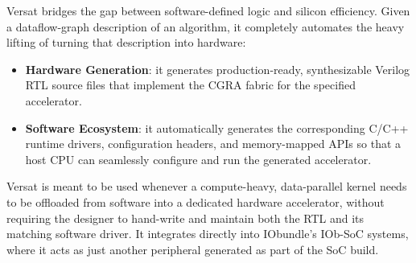 %

Versat bridges the gap between software-defined logic and silicon
efficiency. Given a dataflow-graph description of an algorithm, it
completely automates the heavy lifting of turning that description into
hardware:

\begin{itemize}
  \itemsep-0.5em
  \item \textbf{Hardware Generation}: it generates production-ready,
    synthesizable Verilog RTL source files that implement the CGRA fabric
    for the specified accelerator.
  \item \textbf{Software Ecosystem}: it automatically generates the
    corresponding C/C++ runtime drivers, configuration headers, and
    memory-mapped APIs so that a host CPU can seamlessly configure and run
    the generated accelerator.
\end{itemize}

Versat is meant to be used whenever a compute-heavy, data-parallel kernel
needs to be offloaded from software into a dedicated hardware accelerator,
without requiring the designer to hand-write and maintain both the RTL and
its matching software driver. It integrates directly into IObundle's
IOb-SoC systems, where it acts as just another peripheral generated as
part of the SoC build.
